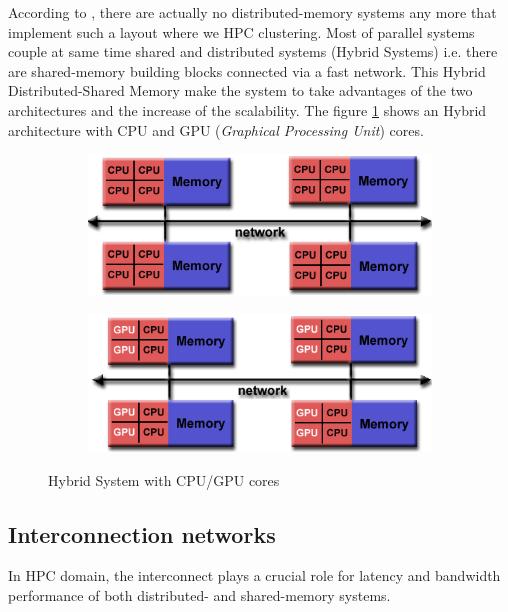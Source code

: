 According to \cite{Hager2010}, there are actually no distributed-memory systems any more that implement such a layout where we HPC clustering. Most of parallel systems couple at same time shared and distributed systems (Hybrid Systems) i.e. there are shared-memory building blocks connected via a fast network. This Hybrid Distributed-Shared Memory make the system to take advantages of the two architectures and the increase of the scalability. The figure \ref{hybrid} shows an Hybrid architecture with CPU and GPU (\textit{Graphical Processing Unit}) cores.
\begin{figure}[!h]
\centering 
  \begin{subfigure}[b]{0.4\textwidth}
    \includegraphics[width=\textwidth]{images/hybrid1.png}
  \end{subfigure}
  \begin{subfigure}[b]{0.4\textwidth}
    \includegraphics[width=\textwidth]{images/hybrid2.png}   
  \end{subfigure} 
   \caption{Hybrid System with CPU/GPU cores}
   \label{hybrid}
\end{figure}
\subsection{Interconnection networks}
In HPC domain, the interconnect plays a crucial role for latency and bandwidth performance of both distributed- and shared-memory systems.

